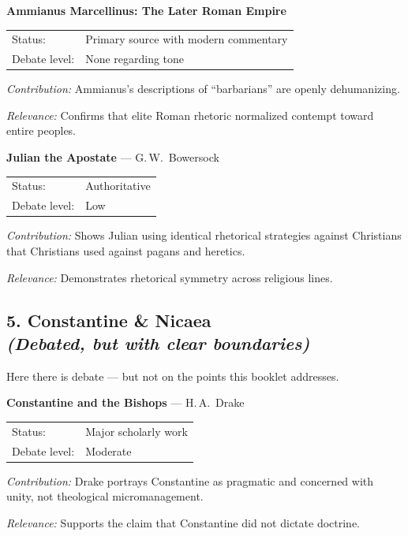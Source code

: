 \documentclass[10pt,twoside,openany]{book}
\begin{document}
\medskip

\textbf{Ammianus Marcellinus: The Later Roman Empire}

\begin{tabular}{@{}ll@{}}
Status: & Primary source with modern commentary \\
Debate level: & None regarding tone
\end{tabular}

\emph{Contribution:}
Ammianus's descriptions of ``barbarians'' are openly dehumanizing.

\emph{Relevance:}
Confirms that elite Roman rhetoric normalized contempt toward
entire peoples.

\medskip

\textbf{Julian the Apostate} --- G.\,W.\ Bowersock

\begin{tabular}{@{}ll@{}}
Status: & Authoritative \\
Debate level: & Low
\end{tabular}

\emph{Contribution:}
Shows Julian using identical rhetorical strategies against Christians
that Christians used against pagans and heretics.

\emph{Relevance:}
Demonstrates rhetorical symmetry across religious lines.

\subsection{\texorpdfstring{5. Constantine \& Nicaea\\{\normalfont\small\itshape (Debated, but with clear boundaries)}}{5. Constantine \& Nicaea (Debated, but with clear boundaries)}}

Here there is debate --- but not on the points this booklet addresses.

\medskip

\textbf{Constantine and the Bishops} --- H.\,A.\ Drake

\begin{tabular}{@{}ll@{}}
Status: & Major scholarly work \\
Debate level: & Moderate
\end{tabular}

\emph{Contribution:}
Drake portrays Constantine as pragmatic and concerned with unity, not
theological micromanagement.

\emph{Relevance:}
Supports the claim that Constantine did not dictate doctrine.
\end{document}
